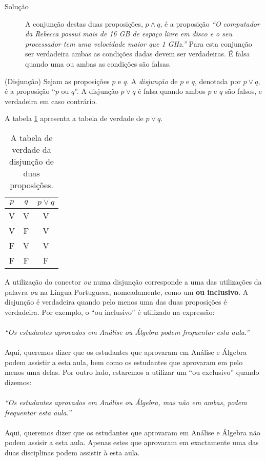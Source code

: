\begin{description}
	\item[Solução] A conjunção destas duas proposições, $p \land q$, é a proposição
	\emph{``O computador da Rebecca possui mais de 16 GB de espaço livre em disco
	e o seu processador tem uma velocidade maior que 1 GHz.''} Para esta conjunção
	ser verdadeira ambas as condições dadas devem ser verdadeiras.  É falsa quando
	uma ou ambas as condições são falsas.
\end{description}

\label{def13}
\begin{defn}
(Disjunção) Sejam as proposições $p$ e $q$. A
	\emph{disjunção} de $p$ e $q$, denotada por $p \lor q$, é a proposição ``$p$
	ou $q$''. A disjunção $p \lor q$ é falsa quando ambos $p$ e $q$ são
	falsos, e verdadeira em caso contrário.
\end{defn}

A tabela \ref{tabela:13} apresenta a tabela de verdade de $p \lor q$.

\begin{table}[H]
\centering
\begin{tabular}{|c|c|c|}%
\toprule
\textbf{$p$} & \textbf{$q$} & \textbf{$p \lor q$}\\ 
\midrule
V & V & V\\
V &	F & V\\
F &	V & V\\
F &	F & F\\
\bottomrule%
\end{tabular}%
\caption{A tabela de verdade da disjunção de duas proposições.}
\label{tabela:13}
\end{table}

A utilização do conector \emph{ou} numa disjunção corresponde a uma das
utilizações da palavra \emph{ou} na Língua Portuguesa, nomeadamente,
como um \textbf{ou inclusivo}. A disjunção é verdadeira quando pelo menos uma
das duas proposições é verdadeira. Por exemplo, o ``ou inclusivo'' é utilizado na
expressão:\\ \\
\emph{``Os estudantes aprovados em Análise ou Álgebra podem frequentar esta
aula.''}\\ \\
Aqui, queremos dizer que os estudantes que aprovaram em Análise e Álgebra podem
assistir a esta aula, bem como os estudantes que aprovaram em pelo menos uma
delas. Por outro lado, estaremos a utilizar um ``ou exclusivo'' quando
dizemos:\\
\\
\emph{``Os estudantes aprovados em Análise ou Álgebra, mas não em ambas, podem
frequentar esta aula.''}\\ \\
Aqui, queremos dizer que os estudantes que aprovaram em Análise e Álgebra não
podem assisir a esta aula. Apenas estes que aprovaram em exactamente uma das duas
disciplinas podem assistir à esta aula.

